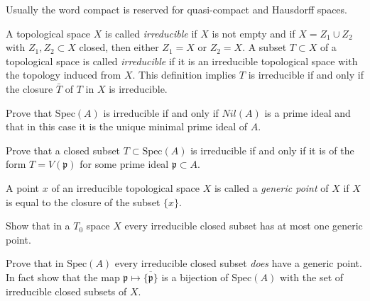 \begin{remark}
\label{remark-not-hausdorff}
Usually the word compact is reserved for quasi-compact and
Hausdorff spaces.
\end{remark}

\begin{definition}
\label{definition-irreducible}
A topological space $X$ is called {\it irreducible} if $X$ is not empty
and if $X = Z_1\cup Z_2$ with $Z_1, Z_2\subset X$ closed, then either
$Z_1 = X$ or $Z_2 = X$. A subset $T\subset X$ of a topological space
is called {\it irreducible} if it is an irreducible
topological space with the topology induced from $X$.
This definition implies $T$ is irreducible if and only
if the closure $\bar T$ of $T$ in $X$ is irreducible.
\end{definition}

\begin{exercise}
\label{exercise-irreducible-spec}
Prove that $\text{Spec}(A)$ is irreducible if and only if
$Nil(A)$ is a prime ideal and that in this case it is the unique
minimal prime ideal of $A$.
\end{exercise}

\begin{exercise}
\label{exercise-irreducible-prime}
Prove that a closed subset $T\subset \text{Spec}(A)$
is irreducible if and only if it is of the form $T = V({\mathfrak p})$ for
some prime ideal ${\mathfrak p}\subset A$.
\end{exercise}

\begin{definition}
\label{definition-generic-point}
A point $x$ of an irreducible topological space $X$ is called
a {\it generic point} of $X$ if $X$ is equal to the closure of
the subset $\{x\}$.
\end{definition}

\begin{exercise}
\label{exercise-irreducible-T0-at-most-one-generic}
Show that in a $T_0$ space $X$ every irreducible closed
subset has at most one generic point.
\end{exercise}

\begin{exercise}
\label{exercise-spec-sober}
Prove that in $\text{Spec}(A)$ every
irreducible closed subset {\it does} have a generic point.
In fact show that the map
${\mathfrak p} \mapsto \overline{\{{\mathfrak p}\}}$ is
a bijection of $\text{Spec}(A)$ with the set of irreducible closed
subsets of $X$.
\end{exercise}

